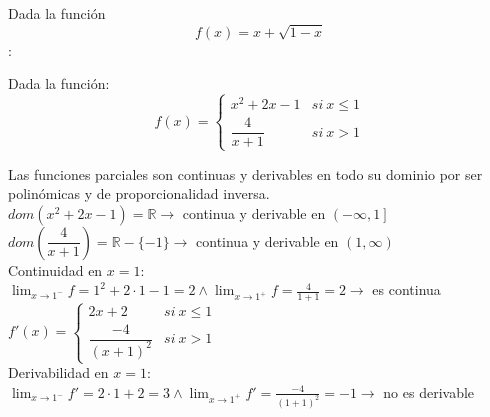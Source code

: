 \documentclass[addpoints,spanish, 12pt,a4paper]{exam}
\begin{document}
\begin{questions}
\question Dada la función $$f(x)=x+\sqrt{1-x}$$:


\question Dada la función:
$$f(x)=\begin{cases} x^{2} + 2 x - 1 & si \ x \leq 1 \\\dfrac{4}{x + 1} & si \ x > 1\end{cases}$$ 

\begin{solution} Las funciones parciales son continuas y derivables en todo su dominio por ser polinómicas y de proporcionalidad inversa. \\
$dom(x^{2} + 2 x - 1)=\mathbb{R} \to$ continua y derivable en $\left(- \infty , 1 \right]$ \\
$ dom(\dfrac{4}{x + 1})= \mathbb{R}-\{ -1 \} \to $ continua y derivable en $\left(1 , \infty \right)$\\
Continuidad en $x=1$: \\
$\lim_{x \to 1^-} f =1^2+2\cdot 1-1=2 \land \lim_{x \to 1^+} f =\frac{4}{1+1}=2 \to$ es continua
$f'(x)=\begin{cases} 2x + 2 & si \ x \leq 1 \\\dfrac{-4}{(x + 1)^2} & si \ x > 1\end{cases}$ \\
Derivabilidad en $x=1$: \\
$\lim_{x \to 1^-}f'=2\cdot 1+2=3 \land \lim_{x \to 1^+}f'=\frac{-4}{(1+1)^2}=-1 \to$ no es derivable



\end{solution}
\end{questions}
\end{document}
